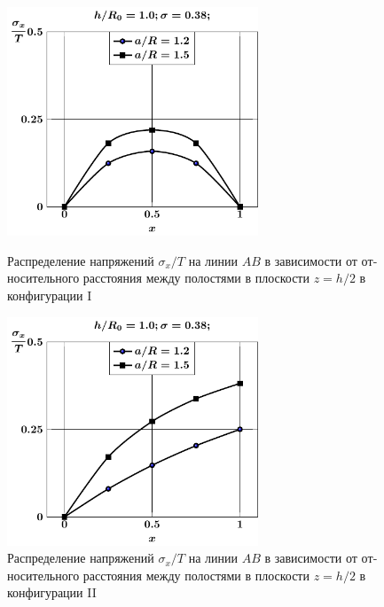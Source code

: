 \begin{russian}
\begin{figure}
\centering\footnotesize
\parbox[b]{7.5cm}{\centering\includegraphics[width=7.5cm]{cav2-a-h10-r10-z1-sig_x.pdf}
\caption{Распределение напряжений $\sigma_x/T$ на линии $AB$ в зависимости от относительного расстояния между полостями в плоскости $z=h/2$ в конфигурации I
\label{f:7:89}}}\hfil\hfil
\parbox[b]{7.5cm}{\centering\includegraphics[width=7.5cm]{cav2a-a-h10-r10-z1-sig_x.pdf}
\caption{Распределение напряжений $\sigma_x/T$ на линии $AB$ в зависимости от относительного расстояния между полостями в плоскости $z=h/2$ в конфигурации II
\label{f:7:90}}}
\end{figure}


\end{russian}
